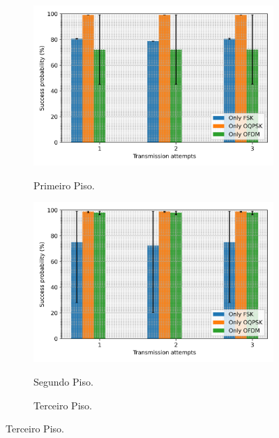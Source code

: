 \begin{figure}[ht!]
    \centering
    \begin{subfigure}{.4\textwidth}
        \centering
        \caption{Primeiro Piso.}
        \includegraphics[width=\textwidth]{./sections/textual/chapters/images/mod_1_floor.png}
        \label{fig:piso1}
    \end{subfigure}
    \begin{subfigure}{.4\textwidth}
        \centering
        \caption{Segundo Piso.}
        \includegraphics[width=\textwidth]{./sections/textual/chapters/images/mod_2_floor.png}
        \label{fig:piso2}
    \end{subfigure}
    \begin{subfigure}{.4\textwidth}
        \centering
        \caption{Terceiro Piso.}

\end{subfigure}
\end{figure}
